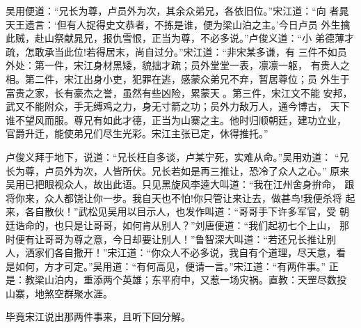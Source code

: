 吴用便道：“兄长为尊，卢员外为次，其余众弟兄，各依旧位。”宋江道：“向
者晁天王遗言：‘但有人捉得史文恭者，不拣是谁，便为梁山泊之主。’今日卢员
外生擒此贼，赴山祭献晁兄，报仇雪恨，正当为尊，不必多说。”卢俊义道：“小
弟德薄才疏，怎敢承当此位!若得居末，尚自过分。”宋江道：“非宋某多谦，有
三件不如员外处：第一件，宋江身材黑矮，貌拙才疏；员外堂堂一表，凛凛一躯，
有贵人之相。第二件，宋江出身小吏，犯罪在逃，感蒙众弟兄不弃，暂居尊位；员
外生于富贵之家，长有豪杰之誉，虽然有些凶险，累蒙天。第三件，宋江文不能
安邦，武又不能附众，手无缚鸡之力，身无寸箭之功；员外力敌万人，通今博古，
天下谁不望风而服。尊兄有如此才德，正当为山寨之主。他时归顺朝廷，建功立业，
官爵升迁，能使弟兄们尽生光彩。宋江主张已定，休得推托。”

卢俊义拜于地下，说道：“兄长枉自多谈，卢某宁死，实难从命。”吴用劝道：
“兄长为尊，卢员外为次，人皆所伏。兄长若如是再三推让，恐冷了众人之心。”
原来吴用已把眼视众人，故出此语。只见黑旋风李逵大叫道：“我在江州舍身拚命，
跟将你来，众人都饶让你一步。我自天也不怕!你只管让来让去，做甚鸟!我便杀将
起来，各自散伙！”武松见吴用以目示人，也发作叫道：“哥哥手下许多军官，受
朝廷诰命的，也只是让哥哥，如何肯从别人？”刘唐便道：“我们起初七个上山，
那时便有让哥哥为尊之意，今日却要让别人！”鲁智深大叫道：“若还兄长推让别
人，洒家们各自撒开！”宋江道：“你众人不必多说，我自有个道理，尽天意，看
是如何，方才可定。”吴用道：“有何高见，便请一言。”宋江道：“有两件事。”
正是：教梁山泊内，重添两个英雄；东平府中，又惹一场灾祸。直教：天罡尽数投
山寨，地煞空群聚水涯。

毕竟宋江说出那两件事来，且听下回分解。